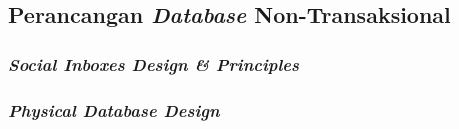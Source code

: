 
\subsection{Perancangan \textit{Database} Non-Transaksional}
	
	\subsubsection{\textit{Social Inboxes Design \& Principles}}
		
	
	\subsubsection{\textit{Physical Database Design}}
	

%   	
    